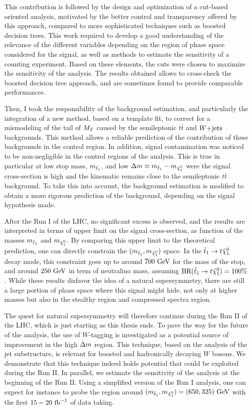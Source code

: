 This contribution is followed by the design and optimization of a cut-based oriented
analysis, motivated by the better control and transparency offered by this approach,
compared to more sophisticated techniques such as boosted decision trees.
This work required to develop a good understanding of the relevance of the different
variables depending on the region of phase space considered for the signal, as well as methods
to estimate the sensitivity of a counting experiment. Based on these elements, the
cuts were chosen to maximize the sensitivity of the analysis. The results obtained
allows to cross-check the boosted decision tree approach, and are sometimes found to
provide comparable performances.

Then, I took the responsibility of the background estimation, and particularly the integration
of a new method, based on a template fit, to correct for a mismodeling of the tail of $M_T$ caused
by the semileptonic $t\bar{t}$ and $\text{$W$+jets}$ backgrounds. This method allows a reliable
prediction of the contribution of these backgrounds in the control region. In addition, signal
contamination was noticed to be non-negligible in the control regions of the analysis. This
is true in particular at low stop mass, $m_{\tilde{t}_1}$, and low $\Delta m \equiv m_{\tilde{t}_1} -
m_{\tilde{\chi}_1^0}$ were the signal cross-section is high and the kinematic remains close
to the semileptonic $t\bar{t}$ background. To take this into account, the background estimation
is modified to obtain a more rigorous prediction of the background, depending on the signal
hypothesis made.

After the Run I of the LHC, no significant excess is observed, and the results are
interpreted in terms of upper limit on the signal cross-section, as function of the masses
$m_{\tilde{t}_1}$ and $m_{\tilde{\chi}_1^0}$. By comparing
this upper limit to the theoretical prediction, one can directly constrain the
$(m_{\tilde{t}_1},m_{\tilde{\chi}_1^0})$ space. In the $\tilde{t}_1 \rightarrow t \tilde{\chi}_1^0$
decay mode, this constraint goes up to around $700~\text{GeV}$ for the mass of the stop,
and around $250~\text{GeV}$ in term of neutralino mass, assuming $\text{BR}(\tilde{t}_1 \rightarrow t
\tilde{\chi}_1^0) = 100\%$. While these results disfavor the idea of a natural supersymmetry,
there are still a large portion of phase space where this signal might hide,
not only at higher masses but also in the stealthy region and compressed spectra region.

The quest for natural supersymmetry will therefore continue during the Run II of the LHC,
which is just starting as this thesis ends. To pave the way for the future
of the analysis, the use of $W$-tagging is investigated as a potential source of improvement
in the high $\Delta m$ region. This technique, based on the analysis of the jet substructure, is
relevant for boosted and hadronically decaying $W$ bosons. We demonstrate that
this technique indeed holds potential that could be exploited during the Run II. In parallel,
 we estimate the sensitivity of the analysis at the beginning of the Run II. Using a
simplified version of the Run I analysis, one can expect for instance
to probe the region around $(m_{\tilde{t}_1},m_{\tilde{\chi}_1^0}) = (650,325)~\text{GeV}$
with the first $15-20~\text{fb}^{-1}$ of data taking.

